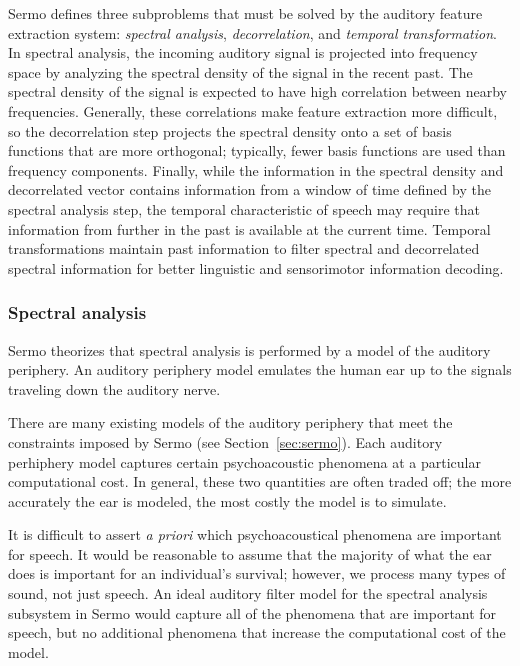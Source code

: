 Sermo defines three subproblems
that must be solved
by the auditory feature extraction system:
\textit{spectral analysis},
\textit{decorrelation},
and \textit{temporal transformation}.
In spectral analysis,
the incoming auditory signal
is projected into frequency space
by analyzing the spectral density
of the signal in the recent past.
The spectral density of the signal
is expected to have high
correlation between nearby frequencies.
Generally, these correlations
make feature extraction more difficult,
so the decorrelation step
projects the spectral density
onto a set of basis functions
that are more orthogonal;
typically, fewer basis functions
are used than frequency components.
Finally, while the information
in the spectral density
and decorrelated vector
contains information from
a window of time defined by
the spectral analysis step,
the temporal characteristic of speech
may require that information
from further in the past is available
at the current time.
Temporal transformations
maintain past information
to filter spectral
and decorrelated spectral information
for better linguistic
and sensorimotor information decoding.

\subsubsection{Spectral analysis}

Sermo theorizes that spectral analysis
is performed by a model
of the auditory periphery.
An auditory periphery model
emulates the human ear
up to the signals
traveling down the auditory nerve.

There are many existing
models of the auditory periphery
that meet the constraints
imposed by Sermo (see Section~\ref{sec:sermo}).
Each auditory perhiphery model
captures certain psychoacoustic phenomena
at a particular computational cost.
In general, these two quantities
are often traded off;
the more accurately the ear is modeled,
the most costly the model is to simulate.

It is difficult to assert \textit{a priori}
which psychoacoustical phenomena
are important for speech.
It would be reasonable to assume that
the majority of what the ear does
is important for an individual's survival;
however, we process many types of sound,
not just speech.
An ideal auditory filter model
for the spectral analysis subsystem
in Sermo
would capture all of the phenomena
that are important for speech,
but no additional phenomena
that increase the computational cost
of the model.

